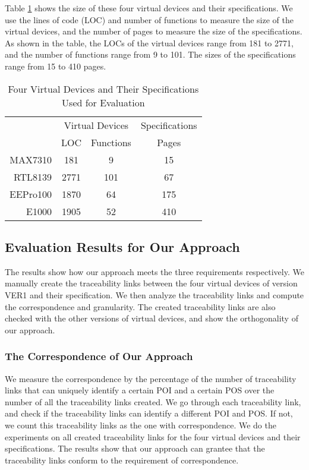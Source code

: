 Table \ref{table:vdd} shows the size of these four virtual devices and their specifications. We use the lines of code (LOC) and number of functions to measure the size of the virtual devices, and the number of pages to measure the size of the specifications. As shown in the table, the LOCs of the virtual devices range from 181 to 2771, and the number of functions range from 9 to 101. The sizes of the specifications range from 15 to 410 pages.

\begin{table}[th]
\caption{Four Virtual Devices and Their Specifications Used for Evaluation}
\centering
\begin{tabular*}{0.6\textwidth}{@{\extracolsep{\fill}}rccc}
\hline
 & \multicolumn{2}{c}{Virtual Devices} & Specifications \\
\cline{2-3} \cline{4-4}
 & LOC & Functions & Pages \\
\hline
MAX7310 & 181 & 9 & 15\\
RTL8139  & 2771 & 101 & 67\\
EEPro100  & 1870 & 64 & 175\\
E1000  & 1905 & 52 & 410\\
\hline
\end{tabular*}
\label{table:vdd}
\end{table}


\subsection{Evaluation Results for Our Approach}
The results show how our approach meets the three requirements respectively. We manually create the traceability links between the four virtual devices of version VER1 and their specification. We then analyze the traceability links and compute the correspondence and granularity. The created traceability links are also checked with the other versions of virtual devices, and show the orthogonality of our approach.

\subsubsection{The Correspondence of Our Approach}
We measure the correspondence by the percentage of the number of traceability links that can uniquely identify a certain POI and a certain POS over the number of all the traceability links created. We go through each traceability link, and check if the traceability links can identify a different POI and POS. If not, we count this traceability links as the one with correspondence. We do the experiments on all created traceability links for the four virtual devices and their specifications. The results show that our approach can grantee that the traceability links conform to the requirement of correspondence.

